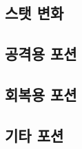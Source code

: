 \documentclass{report}
\begin{document}
	\subsection{스탯 변화}
		
	
	\subsection{공격용 포션}
		
	
	\subsection{회복용 포션}
		
	
	\subsection{기타 포션}
		
\end{document}
